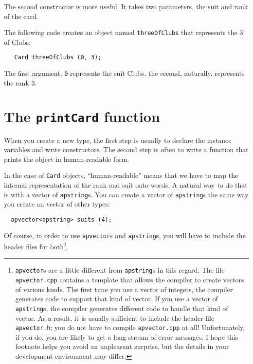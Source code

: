 The second constructor is more useful.  It takes two parameters,
the suit and rank of the card.


The following code creates an object named {\tt threeOfClubs}
that represents
the 3 of Clubs:

\begin{verbatim}
   Card threeOfClubs (0, 3);
\end{verbatim}
%
The first argument, {\tt 0} represents the suit Clubs, the
second, naturally, represents the rank 3.

\section{The {\tt printCard} function}

When you create a new type, the first step is usually to declare the
instance variables and write constructors.  The second step is often
to write a function that prints the object in human-readable form.


In the case of {\tt Card} objects, ``human-readable'' means that we
have to map the internal representation of the rank and suit onto
words.  A natural way to do that is with a vector of {\tt apstring}s.
You can create a vector of {\tt apstring}s the same way you create an
vector of other types:

\begin{verbatim}
  apvector<apstring> suits (4);
\end{verbatim}
%
Of course, in order to use {\tt apvector}s and {\tt apstring}s, you
will have to include the header files for both\footnote{{\tt apvector}s
are a little different from {\tt apstring}s in this regard.
The file {\tt apvector.cpp} contains a template that allows the
compiler to create vectors of various kinds.  The first time you
use a vector of integers, the compiler generates code
to support that kind of vector.  If you use a vector of {\tt apstring}s,
the compiler generates different code to handle that kind of
vector.  As a result, it is usually sufficient to include the
header file {\tt apvector.h}; you do not have to compile
{\tt apvector.cpp} at all!  Unfortunately, if you do, you are
likely to get a long stream of error messages.  I hope this
footnote helps you avoid an unpleasant surprise, but the details
in your development environment may differ.}.

